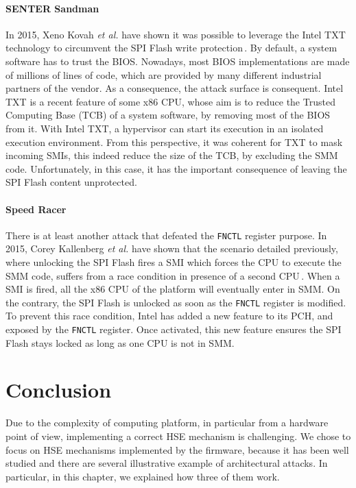 \paragraph{SENTER Sandman}
%
In 2015, Xeno Kovah \emph{et al.} have shown it was possible to leverage the
Intel TXT technology to circumvent the SPI Flash write
protection\,\cite{kovah2015senter}.
%
By default, a system software has to trust the BIOS.
%
Nowadays, most BIOS implementations are made of millions of lines of code, which
are provided by many different industrial partners of the vendor.
%
As a consequence, the attack surface is consequent.
%
Intel TXT is a recent feature of some x86 CPU, whose aim is to reduce the
Trusted Computing Base (TCB) of a system software, by removing most of the BIOS
from it.
%
With Intel TXT, a hypervisor can start its execution in an isolated execution
environment.
%
From this perspective, it was coherent for TXT to mask incoming SMIs, this
indeed reduce the size of the TCB, by excluding the SMM code.
%
Unfortunately, in this case, it has the important consequence of leaving the SPI
Flash content unprotected.

\paragraph{Speed Racer}
%
There is at least another attack that defeated the \texttt{FNCTL} register
purpose.
%
In 2015, Corey Kallenberg \emph{et al.} have shown that the scenario detailed
previously, where unlocking the SPI Flash fires a SMI which forces the CPU to
execute the SMM code, suffers from a race condition in presence of a second
CPU\,\cite{kallenberg2015racecondition}.
%
When a SMI is fired, all the x86 CPU of the platform will eventually enter in
SMM.
%
On the contrary, the SPI Flash is unlocked as soon as the \texttt{FNCTL}
register is modified.
%
To prevent this race condition, Intel has added a new feature to its PCH, and
exposed by the \texttt{FNCTL} register.
%
Once activated, this new feature ensures the SPI Flash stays locked as long as
one CPU is not in SMM.

\section{Conclusion}
\label{sec:usecase:conclusion}

Due to the complexity of computing platform, in particular from a hardware point
of view, implementing a correct HSE mechanism is challenging.
%
We chose to focus on HSE mechanisms implemented by the firmware, because it has
been well studied and there are several illustrative example of architectural
attacks.
%
In particular, in this chapter, we explained how three of them work.